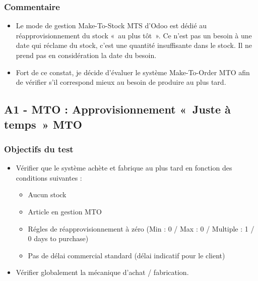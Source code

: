 \documentclass[letterpaper,10pt,french]{sphinxmanual}
\begin{document}
\subsubsection{Commentaire}
\label{\detokenize{readthedocs/tests/A1_MTS:commentaire}}\begin{itemize}
\item {} 
Le mode de gestion Make-To-Stock MTS d’Odoo est dédié au réapprovisionnement du stock « au plus tôt ». Ce n’est pas un besoin à une date qui réclame du stock, c’est une quantité insuffisante dans le stock. Il ne prend pas en considération la date du besoin.

\item {} 
Fort de ce constat, je décide d’évaluer le système Make-To-Order MTO afin de vérifier s’il correspond mieux au besoin de produire au plus tard.

\end{itemize}


\subsection{A1 - MTO : Approvisionnement « Juste à temps » MTO}
\label{\detokenize{readthedocs/tests/A1_MTO:a1-mto-approvisionnement-juste-a-temps-mto}}\label{\detokenize{readthedocs/tests/A1_MTO::doc}}

\subsubsection{Objectifs du test}
\label{\detokenize{readthedocs/tests/A1_MTO:objectifs-du-test}}\begin{itemize}
\item {} 
Vérifier que le système achète et fabrique au plus tard en fonction des conditions suivantes :
\begin{itemize}
\item {} 
Aucun stock

\item {} 
Article en gestion MTO

\item {} 
Régles de réapprovisionnement à zéro (Min : 0 / Max : 0 / Multiple : 1 / 0 days to purchase)

\item {} 
Pas de délai commercial standard (délai indicatif pour le client)

\end{itemize}

\item {} 
Vérifier globalement la mécanique d’achat / fabrication.

\end{itemize}
\end{document}
